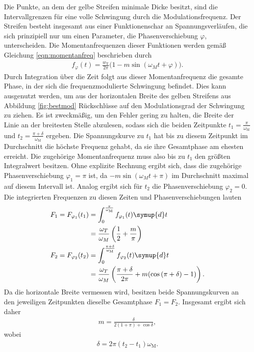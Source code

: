 Die Punkte, an dem der gelbe Streifen minimale Dicke besitzt, sind die
Intervallgrenzen für eine volle Schwingung durch die Modulationsfrequenz. Der Streifen besteht insgesamt aus
einer Funktionenschar an Spannungsverläufen, die sich prinzipiell nur um einen Parameter, die Phasenverschiebung $\varphi$,
unterscheiden. Die Momentanfrequenzen dieser Funktionen werden gemäß Gleichung \eqref{eqn:momentanfreq} beschrieben durch
\begin{align}
  f_{\varphi}(t) = \frac{w_\text{T}}{2 \pi} \bigl(1 - m \sin{(\omega_M t + \varphi)}\bigr).
\end{align}
Durch Integration über die Zeit folgt aus dieser Momentanfrequenz die gesamte Phase, in der sich die frequenzmodulierte
Schwingung befindet. Dies kann ausgenutzt werden, um aus der horizontalen Breite des gelben Streifens aus Abbildung \ref{fig:bestmod}
Rückschlüsse auf den Modulationsgrad der Schwingung zu ziehen. Es ist zweckmäßig, um den Fehler gering zu halten,
die Breite der Linie an der breitesten Stelle abzulesen, sodass sich die beiden Zeitpunkte $t_1 = \frac{\pi}{\omega_\text{M}}$
und $t_2 = \frac{\pi + \delta}{\omega_\text{M}}$ ergeben. Die Spannungskurve zu $t_1$ hat bis zu diesem
Zeitpunkt im Durchschnitt die höchste Frequenz gehabt, da sie ihre Gesamtphase am ehesten erreicht. Die zugehörige Momentanfrequenz
muss also bis zu $t_1$ den größten Integralwert besitzen. Ohne explizite Rechnung ergibt sich, dass die zugehörige
Phasenverschiebung $\varphi_1 = \pi$ ist, da $-m\sin{(\omega_M t + \pi)}$ im Durchschnitt maximal auf diesem Intervall ist.
Analog ergibt sich für $t_2$ die Phasenverschiebung $\varphi_2 = 0$. Die integrierten Frequenzen zu diesen Zeiten und Phasenverschiebungen lauten
\begin{align}
  F_1 = F_{\varphi_1}(t_1) &= \int_{0}^{\frac{\pi}{\omega_\text{M}}} f_{\varphi_1}(t) \symup{d}t \\
  &= \frac{\omega_T}{\omega_M} \left( \frac12 + \frac{m}{\pi} \right) \\
  F_2 = F_{\varphi_2}(t_2) &= \int_{0}^{\frac{\pi+\delta}{\omega_\text{M}}} f_{\varphi_2}(t) \symup{d}t \\
  &= \frac{\omega_T}{\omega_M} \left( \frac{\pi + \delta}{2 \pi} + m(\cos{(\pi + \delta)} - 1) \right).
\end{align}
Da die horizontale Breite vermessen wird, besitzen beide Spannungskurven an den jeweiligen Zeitpunkten dieselbe Gesamtphase $F_1 = F_2$.
Insgesamt ergibt sich daher
\begin{align}
  m = \frac{\delta}{2(1+\pi) + \cos{\delta}},
  \label{eqn:mfuerfreqmod}
\end{align}
wobei
\begin{align}
  \delta = 2 \pi (t_2 - t_1) \omega_\text{M}.
\end{align}
